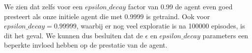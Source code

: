 \documentclass[11pt]{article}
\begin{document}
\noindent We zien dat zelfs voor een $epsilon\_decay$ factor van 0.99 de agent even goed presteert als onze initiele agent die met 0.9999 is getraind. Ook voor $epsilon\_decay = 0.99999$, waarbij er nog veel exploratie is na 100000 episodes, is dit het geval. We kunnen dus besluiten dat de $\epsilon$ en $epsilon\_decay$ parameters een beperkte invloed hebben op de prestatie van de agent.\\\\
\end{document}
